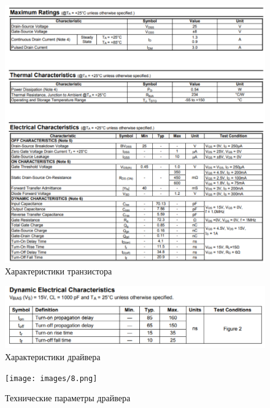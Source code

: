 \begin{figure}
	\centering
	\caption{Характеристики транзистора}
	\includegraphics{images/6.png}
\end{figure}

\begin{figure}
	\centering
	\caption{Характеристики драйвера}
	\includegraphics{images/7.png}
\end{figure}

\begin{figure}
	\centering
	\caption{Технические параметры драйвера}
	\texttt{[image: images/8.png]}
\end{figure}


